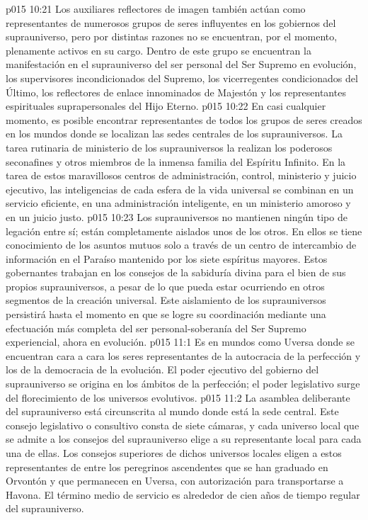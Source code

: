 \vs p015 10:21 \pc Los auxiliares reflectores de imagen también actúan como representantes de numerosos grupos de seres influyentes en los gobiernos del suprauniverso, pero por distintas razones no se encuentran, por el momento, plenamente activos en su cargo. Dentro de este grupo se encuentran la manifestación en el suprauniverso del ser personal del Ser Supremo en evolución, los supervisores incondicionados del Supremo, los vicerregentes condicionados del Último, los reflectores de enlace innominados de Majestón y los representantes espirituales suprapersonales del Hijo Eterno.
\vs p015 10:22 \pc En casi cualquier momento, es posible encontrar representantes de todos los grupos de seres creados en los mundos donde se localizan las sedes centrales de los suprauniversos. La tarea rutinaria de ministerio de los suprauniversos la realizan los poderosos seconafines y otros miembros de la inmensa familia del Espíritu Infinito. En la tarea de estos maravillosos centros de administración, control, ministerio y juicio ejecutivo, las inteligencias de cada esfera de la vida universal se combinan en un servicio eficiente, en una administración inteligente, en un ministerio amoroso y en un juicio justo.
\vs p015 10:23 Los suprauniversos no mantienen ningún tipo de legación entre sí; están completamente aislados unos de los otros. En ellos se tiene conocimiento de los asuntos mutuos solo a través de un centro de intercambio de información en el Paraíso mantenido por los siete espíritus mayores. Estos gobernantes trabajan en los consejos de la sabiduría divina para el bien de sus propios suprauniversos, a pesar de lo que pueda estar ocurriendo en otros segmentos de la creación universal. Este aislamiento de los suprauniversos persistirá hasta el momento en que se logre su coordinación mediante una efectuación más completa del ser personal\hyp{}soberanía del Ser Supremo experiencial, ahora en evolución.
\vs p015 11:1 Es en mundos como Uversa donde se encuentran cara a cara los seres representantes de la autocracia de la perfección y los de la democracia de la evolución. El poder ejecutivo del gobierno del suprauniverso se origina en los ámbitos de la perfección; el poder legislativo surge del florecimiento de los universos evolutivos.
\vs p015 11:2 La asamblea deliberante del suprauniverso está circunscrita al mundo donde está la sede central. Este consejo legislativo o consultivo consta de siete cámaras, y cada universo local que se admite a los consejos del suprauniverso elige a su representante local para cada una de ellas. Los consejos superiores de dichos universos locales eligen a estos representantes de entre los peregrinos ascendentes que se han graduado en Orvontón y que permanecen en Uversa, con autorización para transportarse a Havona. El término medio de servicio es alrededor de cien años de tiempo regular del suprauniverso.
